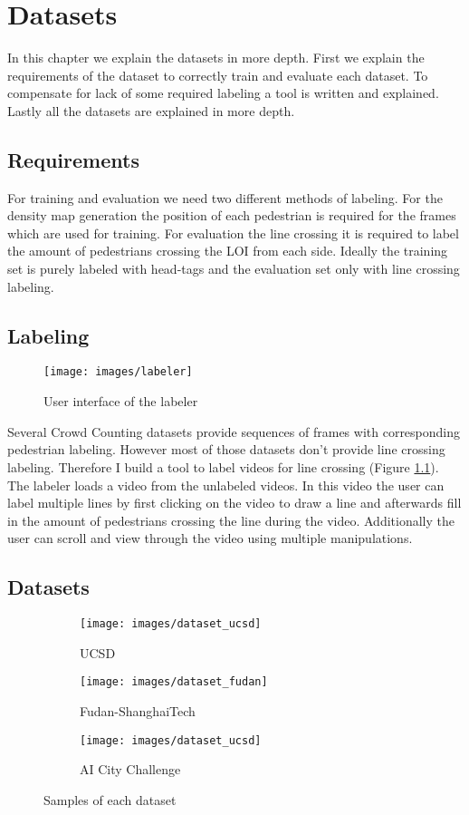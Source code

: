 \chapter{Datasets}
In this chapter we explain the datasets in more depth. First we explain the requirements of the dataset to correctly train and evaluate each dataset. To compensate for lack of some required labeling a tool is written and explained. Lastly all the datasets are explained in more depth.

\section{Requirements}
For training and evaluation we need two different methods of labeling. For the density map generation the position of each pedestrian is required for the frames which are used for training. For evaluation the line crossing it is required to label the amount of pedestrians crossing the LOI from each side. Ideally the training set is purely labeled with head-tags and the evaluation set only with line crossing labeling.

\section{Labeling}
\begin{figure}[!htb]
\centering
\texttt{[image: images/labeler]}
\caption{User interface of the labeler}
\label{fig:labeler}
\end{figure}

Several Crowd Counting datasets provide sequences of frames with corresponding pedestrian labeling. However most of those datasets don't provide line crossing labeling. Therefore I build a tool to label videos for line crossing (Figure \ref{fig:labeler}).
The labeler loads a video from the unlabeled videos. In this video the user can label multiple lines by first clicking on the video to draw a line and afterwards fill in the amount of pedestrians crossing the line during the video. Additionally the user can scroll and view through the video using multiple manipulations.


\section{Datasets}
\begin{figure}[h]
\centering
\begin{subfigure}{.33\textwidth}
  \centering
  \texttt{[image: images/dataset\_ucsd]}
  \caption{UCSD}
  \label{fig:dataset_ucsd}
\end{subfigure}%
\begin{subfigure}{.33\textwidth}
  \centering
  \texttt{[image: images/dataset\_fudan]}
  \caption{Fudan-ShanghaiTech}
  \label{fig:dataset_fudan}
\end{subfigure}%
\begin{subfigure}{.33\textwidth}
  \centering
  \texttt{[image: images/dataset\_ucsd]}
  \caption{AI City Challenge}
  \label{fig:dataset_aicity}
\end{subfigure}%
\caption{Samples of each dataset}
\label{fig:datasets}
\end{figure}

